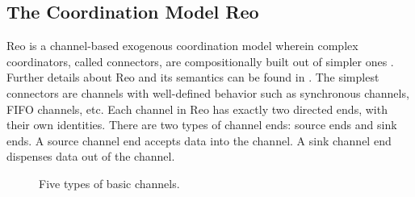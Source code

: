 \documentclass{llncs}
\newcommand{\redt}[1]{\textcolor{red}{#1}}
\begin{document}
\subsection{The Coordination Model Reo}
Reo is a channel-based exogenous coordination model wherein complex coordinators, called connectors,
are compositionally built out of simpler ones \cite{Arb04}.
Further details about Reo and its semantics can be found in \cite{Arb04,AR03,BSAR06}.
The simplest connectors are channels with well-defined behavior such as synchronous channels, FIFO channels, etc.
Each channel in Reo has exactly two directed ends, with their own identities.
There are two types of channel ends: source ends and sink ends. A source channel end accepts
data into the channel. A sink channel end dispenses data out of the channel.
\begin{figure}
  \centering
  \vspace{-6mm}
  \caption{Five types of basic channels.}\label{fig:basicchannel}
\end{figure}
\end{document}
